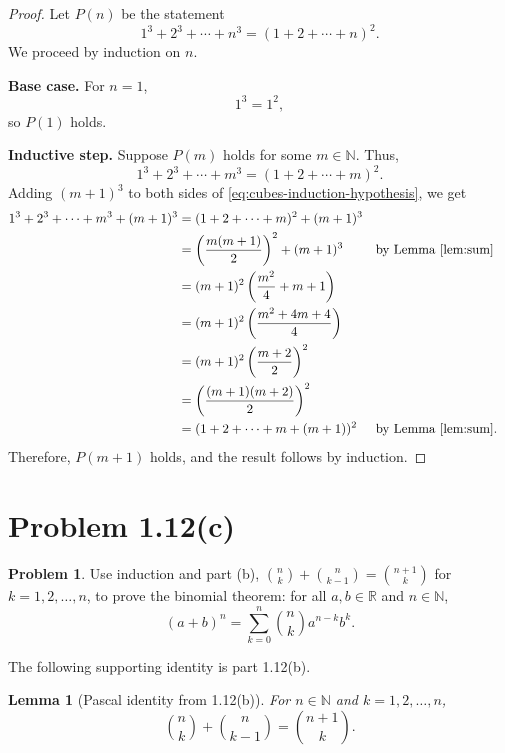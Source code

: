 \documentclass{article}
\newtheorem{lemma}{Lemma}
\theoremstyle{definition}
\newtheorem*{problem}{Problem}
\begin{document}
\begin{proof}
Let \(P(n)\) be the statement
\[
1^3+2^3+\cdots+n^3=(1+2+\cdots+n)^2.
\]
We proceed by induction on \(n\).

\textbf{Base case.} For \(n=1\),
\[
1^3=1^2,
\]
so \(P(1)\) holds.

\textbf{Inductive step.} Suppose \(P(m)\) holds for some \(m\in\mathbb{N}\).
Thus,
\begin{equation}\label{eq:cubes-induction-hypothesis}
1^3+2^3+\cdots+m^3=(1+2+\cdots+m)^2.
\end{equation}
Adding \((m+1)^3\) to both sides of \eqref{eq:cubes-induction-hypothesis}, we get
\begin{align*}
1^3+2^3+\cdots+m^3+(m+1)^3
&=(1+2+\cdots+m)^2+(m+1)^3\\
&=\left(\frac{m(m+1)}{2}\right)^2+(m+1)^3
    &&\text{by Lemma~\ref{lem:sum}}\\
&=(m+1)^2\left(\frac{m^2}{4}+m+1\right)\\
&=(m+1)^2\left(\frac{m^2+4m+4}{4}\right)\\
&=(m+1)^2\left(\frac{m+2}{2}\right)^2\\
&=\left(\frac{(m+1)(m+2)}{2}\right)^2\\
&=(1+2+\cdots+m+(m+1))^2
    &&\text{by Lemma~\ref{lem:sum}}.
\end{align*}
Therefore, \(P(m+1)\) holds, and the result follows by induction.
\end{proof}

\clearpage
\section{Problem 1.12(c)}

\begin{problem}
Use induction and part (b), $\binom{n}{k}+\binom{n}{k-1}=\binom{n+1}{k}$ for $k=1,2,\ldots,n$, to prove the binomial theorem: for all $a,b\in\mathbb{R}$ and $n\in\mathbb{N}$,
\[
(a+b)^n=\sum_{k=0}^{n}\binom{n}{k}a^{n-k}b^k.
\]
\end{problem}

The following supporting identity is part 1.12(b).

\begin{lemma}[Pascal identity from 1.12(b)]
For \(n \in \mathbb{N}\) and \(k=1,2,\ldots,n\),
\[
\binom{n}{k}+\binom{n}{k-1}=\binom{n+1}{k}.
\]
\end{lemma}
\end{document}
